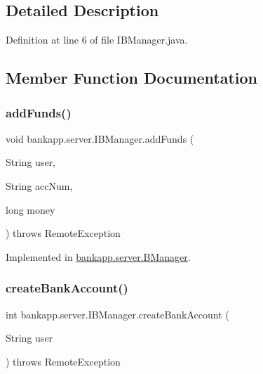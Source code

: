 \subsection{Detailed Description}


Definition at line 6 of file I\+B\+Manager.\+java.



\subsection{Member Function Documentation}
\mbox{\label{interfacebankapp_1_1server_1_1_i_b_manager_a31f275bed15b74bb2bc6ef43ede7f7f8}} 
\subsubsection{\texorpdfstring{add\+Funds()}{addFunds()}}
{\footnotesize\ttfamily void bankapp.\+server.\+I\+B\+Manager.\+add\+Funds (\begin{DoxyParamCaption}\item[{String}]{user,  }\item[{String}]{acc\+Num,  }\item[{long}]{money }\end{DoxyParamCaption}) throws Remote\+Exception}



Implemented in \hyperlink{classbankapp_1_1server_1_1_b_manager_a0c81d9fb02961e95efa371249f284b47}{bankapp.\+server.\+B\+Manager}.

\mbox{\label{interfacebankapp_1_1server_1_1_i_b_manager_aeb423a1ba2348fdaa7d1466a907e82e1}} 
\subsubsection{\texorpdfstring{create\+Bank\+Account()}{createBankAccount()}}
{\footnotesize\ttfamily int bankapp.\+server.\+I\+B\+Manager.\+create\+Bank\+Account (\begin{DoxyParamCaption}\item[{String}]{user }\end{DoxyParamCaption}) throws Remote\+Exception}



